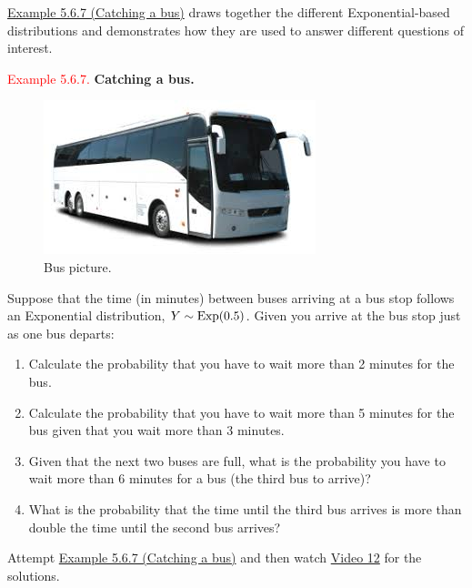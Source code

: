 \documentclass[
]{book}
\providecommand{\tightlist}{%
  \setlength{\itemsep}{0pt}\setlength{\parskip}{0pt}}
\begin{document}
\protect\hyperlink{rv:exer:catch_bus}{Example 5.6.7 (Catching a bus)} draws together the different Exponential-based distributions and demonstrates how they are used to answer different questions of interest.

\leavevmode{}%
\textcolor{red}{Example 5.6.7.}
{\textbf{Catching a bus.}}

\begin{figure}
\includegraphics[width=0.8\linewidth]{Images/bus} \caption{Bus picture.}\label{fig:bus}
\end{figure}

Suppose that the time (in minutes) between buses arriving at a bus stop follows an Exponential distribution, \(Y \sim {\rm Exp} (0.5)\). Given you arrive at the bus stop just as one bus departs:

\begin{enumerate}
\def\labelenumi{(\alph{enumi})}
\tightlist
\item
  Calculate the probability that you have to wait more than 2
  minutes for the bus.\\
\item
  Calculate the probability that you have to wait more than 5
  minutes for the bus given that you wait more than 3 minutes.\\
\item
  Given that the next two buses are full, what is the probability you have to wait more than 6 minutes for a bus (the third bus to arrive)?\\
\item
  What is the probability that the time until the third bus arrives is more than double the time until the second bus arrives?\\
\end{enumerate}

Attempt \protect\hyperlink{rv:exer:catch_bus}{Example 5.6.7 (Catching a bus)} and then watch \protect\hyperlink{video12}{Video 12} for the solutions.
\end{document}
